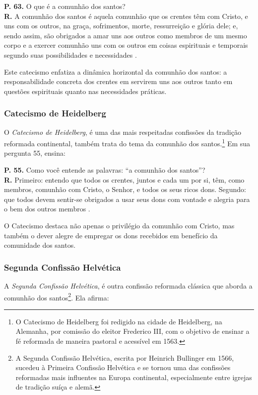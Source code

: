 \begin{citacao}
    \textbf{P. 63.} O que é a comunhão dos santos?\\
    \textbf{R.} A comunhão dos santos é aquela comunhão que os crentes têm com Cristo, e uns com os outros, na graça, sofrimentos, morte, ressurreição e glória dele; e, sendo assim, são obrigados a amar uns aos outros como membros de um mesmo corpo e a exercer comunhão uns com os outros em coisas espirituais e temporais segundo suas possibilidades e necessidades \cite{catecismoMaior}.
\end{citacao}

Este catecismo enfatiza a dinâmica horizontal da comunhão dos santos: a responsabilidade concreta dos crentes em servirem uns aos outros tanto em questões espirituais quanto nas necessidades práticas.

\subsubsection{Catecismo de Heidelberg}
O \textit{Catecismo de Heidelberg}, é uma das mais respeitadas confissões da tradição reformada continental, também trata do tema da comunhão dos santos.\footnote{O Catecismo de Heidelberg foi redigido na cidade de Heidelberg, na Alemanha, por comissão do eleitor Frederico III, com o objetivo de ensinar a fé reformada de maneira pastoral e acessível em 1563.} Em sua pergunta 55, ensina:

\begin{citacao}
    \textbf{P. 55.} Como você entende as palavras: ``a comunhão dos santos''?\\
    \textbf{R.} Primeiro: entendo que todos os crentes, juntos e cada um por si, têm, como membros, comunhão com Cristo, o Senhor, e todos os seus ricos dons. Segundo: que todos devem sentir-se obrigados a usar seus dons com vontade e alegria para o bem dos outros membros \cite{heidelberg}.
\end{citacao}

O Catecismo destaca não apenas o privilégio da comunhão com Cristo, mas também o dever alegre de empregar os dons recebidos em benefício da comunidade dos santos.

\subsubsection{Segunda Confissão Helvética}
A \textit{Segunda Confissão Helvética}, é outra confissão reformada clássica que aborda a comunhão dos santos\footnote{A Segunda Confissão Helvética, escrita por Heinrich Bullinger em 1566, sucedeu à Primeira Confissão Helvética e se tornou uma das confissões reformadas mais influentes na Europa continental, especialmente entre igrejas de tradição suíça e alemã.}. Ela afirma:

